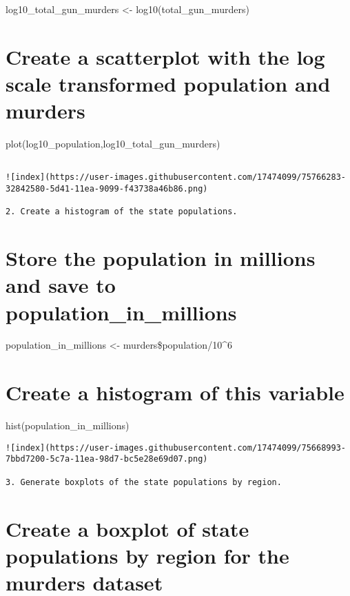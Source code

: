 \documentclass[
]{article}
\begin{document}
log10\_total\_gun\_murders \textless- log10(total\_gun\_murders)

\hypertarget{create-a-scatterplot-with-the-log-scale-transformed-population-and-murders}{%
\section{Create a scatterplot with the log scale transformed population
and
murders}\label{create-a-scatterplot-with-the-log-scale-transformed-population-and-murders}}

plot(log10\_population,log10\_total\_gun\_murders)

\begin{verbatim}

![index](https://user-images.githubusercontent.com/17474099/75766283-32842580-5d41-11ea-9099-f43738a46b86.png)

2. Create a histogram of the state populations.
\end{verbatim}

\hypertarget{store-the-population-in-millions-and-save-to-population_in_millions}{%
\section{Store the population in millions and save to
population\_in\_millions}\label{store-the-population-in-millions-and-save-to-population_in_millions}}

population\_in\_millions \textless- murders\$population/10\^{}6

\hypertarget{create-a-histogram-of-this-variable}{%
\section{Create a histogram of this
variable}\label{create-a-histogram-of-this-variable}}

hist(population\_in\_millions)

\begin{verbatim}
![index](https://user-images.githubusercontent.com/17474099/75668993-7bbd7200-5c7a-11ea-98d7-bc5e28e69d07.png)

3. Generate boxplots of the state populations by region.
\end{verbatim}

\hypertarget{create-a-boxplot-of-state-populations-by-region-for-the-murders-dataset}{%
\section{Create a boxplot of state populations by region for the murders
dataset}\label{create-a-boxplot-of-state-populations-by-region-for-the-murders-dataset}}
\end{document}
